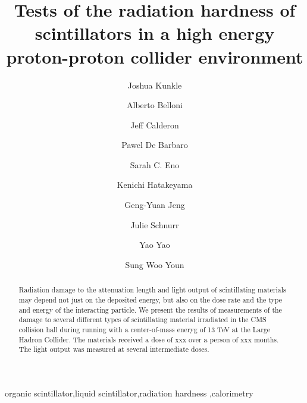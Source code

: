 \documentclass[review]{elsarticle}
\begin{document}
\begin{frontmatter}

\title{Tests of the radiation hardness of scintillators in a high energy proton-proton collider environment }


\author[umd]{Joshua Kunkle}
\author[umd]{Alberto Belloni}
\author[umd]{Jeff Calderon}
\author[rochester]{Pawel De Barbaro}
\author[umd]{Sarah C. Eno}
\author[baylor]{Kenichi Hatakeyama}
\author[umd]{Geng-Yuan Jeng}
\author[umd]{Julie Schnurr}
\author[umd]{Yao Yao}
\author[korea]{Sung Woo Youn}


\address[umd]{Dept. Physics, U. Maryland, College Park MD 30742 USA}
\address[korea]{Institute for Basic Science, Center for Axion and Precision Physics Research, IBS Center for Axion and Precision Physics Research
Room 4315, Department of Physics, Natural Science Building (E6-2), KAIST,
291 Daehak-ro, Yuseong-gu, Daejeon 305-701, South Korea}
\address[fnal]{Fermi National Accelerator Laboratory, Batavia, IL, USA}
\address[baylor]{Baylor University, Waco, Texas, USA}
\address[iowa]{The University of Iowa, Iowa City, IA, USA}
\address[rochester]{The University of Rochester, Rochester, NY, USA}

\begin{abstract}
  Radiation damage to the attenuation length and light output
  of scintillating materials may depend not just on the deposited energy, but also on the dose rate and the type and energy of the interacting particle.
  We present the
  results of measurements of the damage to several different types
  of scintillating material irradiated in the CMS collision hall
  during running with a center-of-mass eneryg of 13 TeV at the Large Hadron Collider.  The materials received a dose of {\color{red} xxx} over a person of {\color{red} xxx} months.  The light output was measured at several intermediate doses.
\end{abstract}

\begin{keyword}
organic scintillator\sep liquid scintillator\sep radiation
hardness \sep calorimetry
\end{keyword}

\end{frontmatter}

\linenumbers
\end{document}
